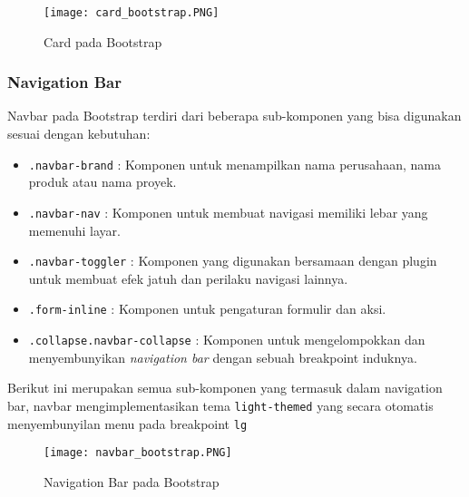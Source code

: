 \begin{figure} [H]
	\centering  
	\texttt{[image: card\_bootstrap.PNG]}  
	\caption{Card pada Bootstrap} 
	\label{fig:cardBootstrap}
\end{figure}

\subsubsection{Navigation Bar}
Navbar pada Bootstrap terdiri dari beberapa sub-komponen yang bisa digunakan sesuai dengan kebutuhan:
\begin{itemize}
	\item \texttt{.navbar-brand} : Komponen untuk menampilkan nama perusahaan, nama produk atau nama proyek.
	\item \texttt{.navbar-nav} : Komponen untuk membuat navigasi memiliki lebar yang memenuhi layar.
	\item \texttt{.navbar-toggler} : Komponen yang digunakan bersamaan dengan plugin untuk membuat efek jatuh dan perilaku navigasi lainnya.
	\item \texttt{.form-inline} : Komponen untuk pengaturan formulir dan aksi.
	\item \texttt{.collapse.navbar-collapse} : Komponen untuk mengelompokkan dan menyembunyikan \textit{navigation bar} dengan sebuah breakpoint induknya.
\end{itemize}
Berikut ini merupakan semua sub-komponen yang termasuk dalam navigation bar, navbar mengimplementasikan tema \texttt{light-themed} yang secara otomatis menyembunyilan menu pada breakpoint \texttt{lg}
\begin{figure} [H]
	\centering  
	\texttt{[image: navbar\_bootstrap.PNG]}  
	\caption{Navigation Bar pada Bootstrap} 
	\label{fig:navBarBootstrap}
\end{figure}

